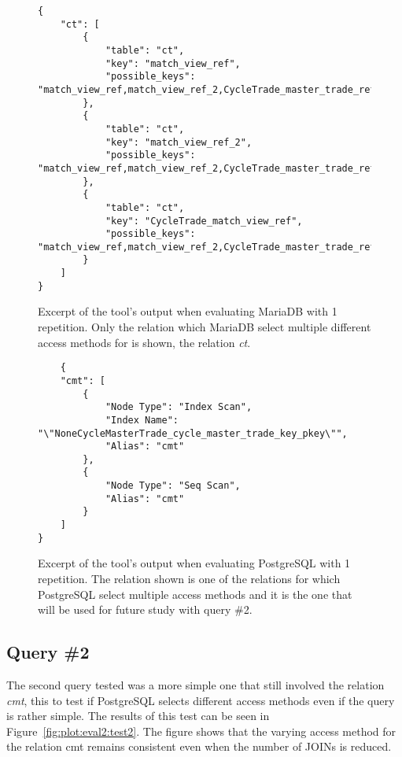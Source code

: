 \begin{figure}[ht]
  \begin{verbatim}
{
    "ct": [
        {
            "table": "ct",
            "key": "match_view_ref",
            "possible_keys": "match_view_ref,match_view_ref_2,CycleTrade_master_trade_ref,CycleTrade_trade_ref,CycleTrade_match_view_ref"
        },
        {
            "table": "ct",
            "key": "match_view_ref_2",
            "possible_keys": "match_view_ref,match_view_ref_2,CycleTrade_master_trade_ref,CycleTrade_trade_ref,CycleTrade_match_view_ref"
        },
        {
            "table": "ct",
            "key": "CycleTrade_match_view_ref",
            "possible_keys": "match_view_ref,match_view_ref_2,CycleTrade_master_trade_ref,CycleTrade_trade_ref,CycleTrade_match_view_ref"
        }
    ]
}
\end{verbatim}
\caption[Excerpt of the tool's output for MariaDB, query \#1 and 1 repetition.]{Excerpt of
  the tool's output when evaluating MariaDB with 1 repetition. Only the
  relation which MariaDB select multiple different access methods for is
  shown, the relation \textit{ct}.}\label{fig:json:eval2:test1:mariadb}
\end{figure}

\begin{figure}[ht]
  \begin{verbatim}
    {
    "cmt": [
        {
            "Node Type": "Index Scan",
            "Index Name": "\"NoneCycleMasterTrade_cycle_master_trade_key_pkey\"",
            "Alias": "cmt"
        },
        {
            "Node Type": "Seq Scan",
            "Alias": "cmt"
        }
    ]
}
\end{verbatim}
\caption[Excerpt of the tool's output for PostgreSQL, query \#1 and 1 repetition.]{Excerpt of
  the tool's output when evaluating PostgreSQL with 1 repetition. The relation
  shown is one of the relations for which PostgreSQL select multiple access
  methods and it is the one that will be used for future study with query \#2.}\label{fig:json:eval2:test1:postgresql}
\end{figure}

\subsection{Query \#2}
The second query tested was a more simple one that still involved the relation
\textit{cmt}, this to test if PostgreSQL selects different access methods even if the
query is rather simple. The results of this test can be seen in
Figure~\ref{fig:plot:eval2:test2}. The figure shows that the varying access
method for the relation cmt remains consistent even when the number of JOINs is reduced.

